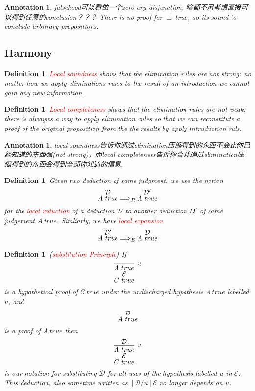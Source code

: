 \documentclass{article}
\theoremstyle{plain}
\newtheorem{definition}[theorem]{Definition}
\newtheorem{annotation}[theorem]{Annotation}
\theoremstyle{nonumberplain}
\newcommand{\redt}[1]{\textcolor{red}{#1}}
\begin{document}
\begin{annotation}
\rm falsehood可以看做一个zero-ary disjunction, 啥都不用考虑直接可以得到任意的conclusion？？？ There is no proof for $\perp~true$, so its sound to conclude arbitrary propositions. 
\end{annotation}

\newpage
\subsection{Harmony}

\begin{definition}
\rm \redt{Local soundness} shows that the elimination rules are not strong: no matter how we apply eliminations rules to the result of an introduction we cannot gain any new information.
\end{definition}

\begin{definition}
\rm \redt{Local completeness} shows that the elimination rules are not weak: there is alwayws a way to apply elimination rules so that we can reconstitute a proof of the original proposition from the the results by apply intruduction ruls. 
\end{definition}

\begin{annotation}
\rm local soundness告诉你通过elimination压缩得到的东西不会比你已经知道的东西强(not strong)，而local completeness告诉你合并通过elimination压缩得到的东西会得到全部你知道的信息. 
\end{annotation}


\begin{definition}
\rm Given two deduction of same judgment, we use the notion
$$
\deduce{A~true}{\mathcal{D}} \Longrightarrow_{R} \deduce{A~true}{\mathcal{D'}} 
$$
for the \redt{local reduction} of a deduction $\mathcal{D}$ to another deduction $D'$ of same judgement $A~true$. Simliarly, we have \redt{local expansion}
$$
\deduce{A~true}{\mathcal{D}'} \Longrightarrow_{E} \deduce{A~true}{\mathcal{D}}
$$
\end{definition}


\begin{definition}
\rm (\redt{substitution Principle}) If 
$$
\deduce[\mathcal{E}]{C~true}{\infer[u]{A~true}{}}
$$
is a hypothetical proof of $\mathcal{C}~true$ under the undischarged hypothesis $A~true$ labelled $u$, and 
$$
\deduce{A~true}{\mathcal{D}}
$$
is a proof of $A~true$ then
$$
\deduce[\mathcal{E}]{C~true}{\infer[u]{A~true}{\mathcal{D}}}
$$
is our notation for substituting $\mathcal{D}$ for all uses of the hypothesis labelled $u$ in $\mathcal{E}$. This deduction, also sometime written as $[\mathcal{D}/u]\mathcal{E}$ no longer depends on $u$.  
\end{definition}
\end{document}
